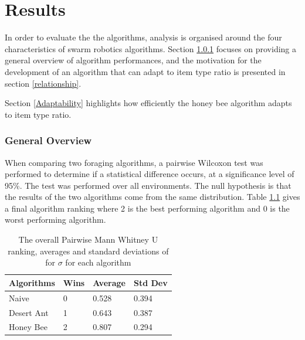 \chapter{Results}
\label{chap:results}

In order to evaluate the the algorithms, analysis is organised around the four characteristics of swarm robotics algorithms. Section \ref{overview} focuses on providing a general overview of algorithm performances, and the motivation for the development of an algorithm that can adapt to item type ratio is presented in section \ref{relationship}. %

 Section \ref{Adaptability} highlights how efficiently the honey bee algorithm adapts to item type ratio. %

\subsection{General Overview}
\label{overview}
When comparing two foraging algorithms, a pairwise Wilcoxon test was performed to determine if a statistical difference occurs, at a significance level of 95\%. The test was performed over all environments. The null  hypothesis is that the results of the two algorithms come from the same distribution. Table \ref{summarytable} gives a final algorithm ranking where 2 is the best performing algorithm and 0 is the worst performing algorithm.

\begin{table}
\centering
    \caption{The overall Pairwise Mann Whitney U ranking, averages and standard deviations of for $\sigma$ for each algorithm}
        \label{summarytable}
    \begin{tabular}{l|lll}
    \hline \hline
    Algorithms & Wins & Average & Std Dev \\ \hline
    Naive      & 0    & 0.528   & 0.394  \\
    Desert Ant  & 1    & 0.643   & 0.387  \\
    Honey Bee   & 2    & 0.807   & 0.294  \\

    \hline
    \end{tabular}
\end{table}


